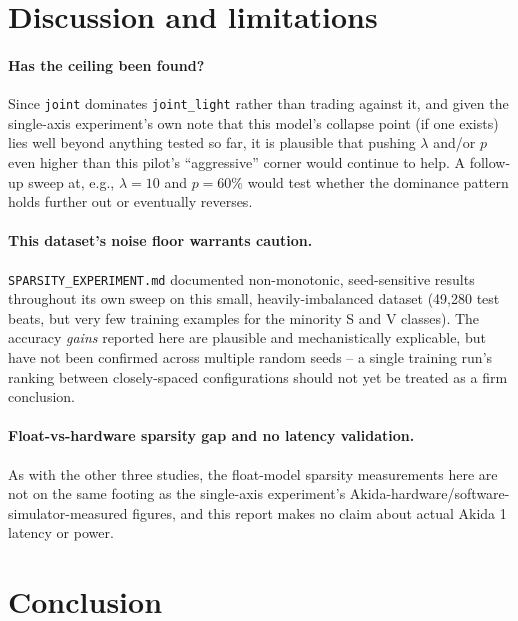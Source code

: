 \documentclass[11pt]{article}
\newcommand{\code}[1]{\texttt{#1}}
\begin{document}
\section{Discussion and limitations}

\paragraph{Has the ceiling been found?} Since \code{joint} dominates \code{joint\_light} rather than trading against it, and given the single-axis experiment's own note that this model's collapse point (if one exists) lies well beyond anything tested so far, it is plausible that pushing $\lambda$ and/or $p$ even higher than this pilot's ``aggressive'' corner would continue to help. A follow-up sweep at, e.g., $\lambda=10$ and $p=60\%$ would test whether the dominance pattern holds further out or eventually reverses.

\paragraph{This dataset's noise floor warrants caution.} \code{SPARSITY\_EXPERIMENT.md} documented non-monotonic, seed-sensitive results throughout its own sweep on this small, heavily-imbalanced dataset (49,280 test beats, but very few training examples for the minority S and V classes). The accuracy \emph{gains} reported here are plausible and mechanistically explicable, but have not been confirmed across multiple random seeds -- a single training run's ranking between closely-spaced configurations should not yet be treated as a firm conclusion.

\paragraph{Float-vs-hardware sparsity gap and no latency validation.} As with the other three studies, the float-model sparsity measurements here are not on the same footing as the single-axis experiment's Akida-hardware/software-simulator-measured figures, and this report makes no claim about actual Akida 1 latency or power.

\section{Conclusion}
\end{document}
